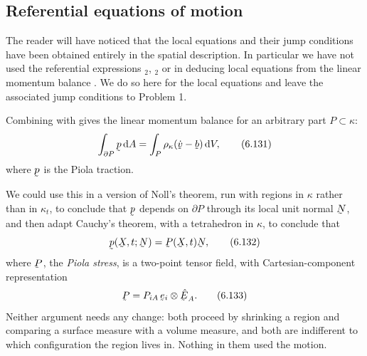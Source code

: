 \subsection{Referential equations of motion}\label{sec:ch6refeqs}

The reader will have noticed that the local equations and their jump
conditions have been obtained entirely in the spatial description. In
particular we have not used the referential expressions
$_{2}$, $_{2}$ or  in deducing local
equations from the linear momentum balance . We do so here
for the local equations and leave the associated jump conditions to
Problem 1.

Combining  with  gives the linear momentum balance
for an arbitrary part $P\subset\kappa$:
\begin{equation}
   \int_{\partial P}\bp\,\dl A=\int_{P}\rho_{\kappa}(\dot\bv-\bb)\,\dl V,
   \tag{6.131}\label{eq:6.131}
\end{equation}
where $\bp$ is the Piola traction.


We could use this in a version of
Noll's theorem, run with regions in $\kappa$ rather than in
$\kappa_{t}$, to conclude that $\bp$ depends on $\partial P$ through
its local unit normal $\bN$, and then adapt Cauchy's theorem, with a
tetrahedron in $\kappa$, to conclude that
\begin{equation}
   \bp(\bX,t;\bN)=\bP(\bX,t)\bN ,
   \tag{6.132}\label{eq:6.132}
\end{equation}
where $\bP$, the \emph{Piola stress}, is a two-point tensor field, with
Cartesian-component representation
\begin{equation}
   \bP=P_{iA}\,\be_{i}\otimes\hbE_{A} .
   \tag{6.133}\label{eq:6.133}
\end{equation}
Neither argument needs any change: both proceed by shrinking a region
and comparing a surface measure with a volume measure, and both are
indifferent to which configuration the region lives in. Nothing in them
used the motion.


